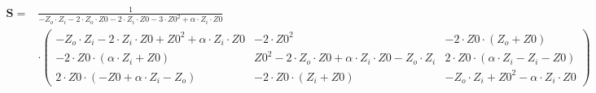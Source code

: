 $\begin{alignedat}{1}\mathbf{S}= & \frac{1}{-Z_o\cdot Z_i-2\cdot
Z_o\cdot Z0-2\cdot Z_i\cdot Z0-3\cdot Z0^2+\alpha\cdot Z_i\cdot Z0}\\
& \cdot \left(\begin{smallmatrix} -Z_o\cdot Z_i-2\cdot Z_i\cdot
Z0+Z0^2+\alpha\cdot Z_i\cdot Z0 & -2\cdot Z0^2 & -2\cdot
Z0\cdot\left(Z_o +Z0\right) \\ -2\cdot Z0 \cdot\left(\alpha\cdot Z_i
+Z0\right) & Z0^2-2\cdot Z_o\cdot Z0+\alpha\cdot Z_i\cdot Z0-Z_o\cdot
Z_i & 2\cdot Z0\cdot\left(\alpha\cdot Z_i-Z_i-Z0\right) \\ 2\cdot
Z0\cdot\left(-Z0+\alpha\cdot Z_i-Z_o\right) & -2\cdot
Z0\cdot\left(Z_i+Z0\right) & -Z_o\cdot Z_i+Z0^2-\alpha\cdot Z_i\cdot
Z0 \end{smallmatrix}\right)\end{alignedat}$
